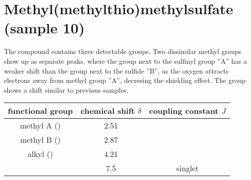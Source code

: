 \section{Methyl(methylthio)methylsulfate (sample 10)}
The compound contains three detectable groups.
Two dissimilar methyl groups show up as separate peaks, where the group next to the sulfinyl group ''A'' has a weaker shift than the group next to the sulfide ''B'', as the oxygen attracts electrons away from methyl group ''A'', decresing the shielding effect.
The  group shows a shift similar to previous samples.

\begin{center}
	\begin{tabular}{cSS}
		\toprule
		functional group&	{chemical shift $\delta$}&	{coupling constant $J$}\\
		\midrule
		methyl A ()&	2.51\\
		methyl B ()&	2.87\\
		alkyl ()&	4.21\\
		&	7.5& {singlet}\\
		\bottomrule
	\end{tabular}
\end{center}
